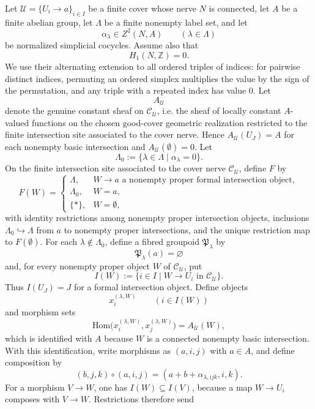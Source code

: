 \begin{lemma}\label{lem:twisted-branch-prestack-model}
Let $\mathcal U=\{U_i\to a\}_{i\in I}$ be a finite cover whose nerve $N$ is connected, let $A$ be a finite abelian group, let $\Lambda$ be a finite nonempty label set, and let
\[
\alpha_\lambda\in Z^2(N,A)
\qquad
(\lambda\in\Lambda)
\]
be normalized simplicial cocycles. Assume also that
\[
H_1(N,\mathbb Z)=0.
\]
We use their alternating extension to all
ordered triples of indices: for pairwise distinct indices, permuting an
ordered simplex multiplies the value by the sign of the permutation, and any
triple with a repeated index has value $0$. Let
\[
A_{\mathcal U}
\]
denote the genuine constant sheaf on $\mathcal C_{\mathcal U}$, i.e. the
sheaf of locally constant $A$-valued functions on the chosen good-cover
geometric realization restricted to the finite intersection site associated to the cover nerve. Hence
$A_{\mathcal U}(U_J)=A$ for each nonempty basic intersection and
$A_{\mathcal U}(\emptyset)=0$.
Let
\[
\Lambda_0:=\{\lambda\in\Lambda\mid \alpha_\lambda=0\}.
\]
On the finite intersection site associated to the cover nerve $\mathcal C_{\mathcal U}$, define $F$ by
\[
F(W)=
\begin{cases}
\Lambda,& W\to a\text{ a nonempty proper formal intersection object},\\
\Lambda_0,& W=a,\\
\{\ast\},& W=\emptyset,
\end{cases}
\]
with identity restrictions among nonempty proper intersection objects,
inclusions $\Lambda_0\hookrightarrow\Lambda$ from $a$ to nonempty proper
intersections, and the unique restriction map to $F(\emptyset)$. For each
$\lambda\notin\Lambda_0$, define a fibred groupoid $\mathfrak P_\lambda$ by
\[
\mathfrak P_\lambda(a)=\varnothing
\]
and, for every nonempty proper object $W$ of $\mathcal C_{\mathcal U}$, put
\[
I(W):=\{i\in I\mid W\to U_i\text{ in }\mathcal C_{\mathcal U}\}.
\]
Thus $I(U_J)=J$ for a formal intersection object. Define objects
\[
x_i^{(\lambda,W)}\qquad (i\in I(W))
\]
and morphism sets
\[
\mathrm{Hom}\bigl(x_i^{(\lambda,W)},x_j^{(\lambda,W)}\bigr)
=A_{\mathcal U}(W),
\]
which is identified with \(A\) because \(W\) is a connected nonempty
basic intersection. With this identification, write morphisms as
\((a,i,j)\) with \(a\in A\), and define composition by
\[
(b,j,k)\circ(a,i,j)=(a+b+\alpha_{\lambda,ijk},i,k).
\]
For a morphism $V\to W$, one has $I(W)\subseteq I(V)$, because a map
$W\to U_i$ composes with $V\to W$. Restrictions therefore send

\end{lemma}
